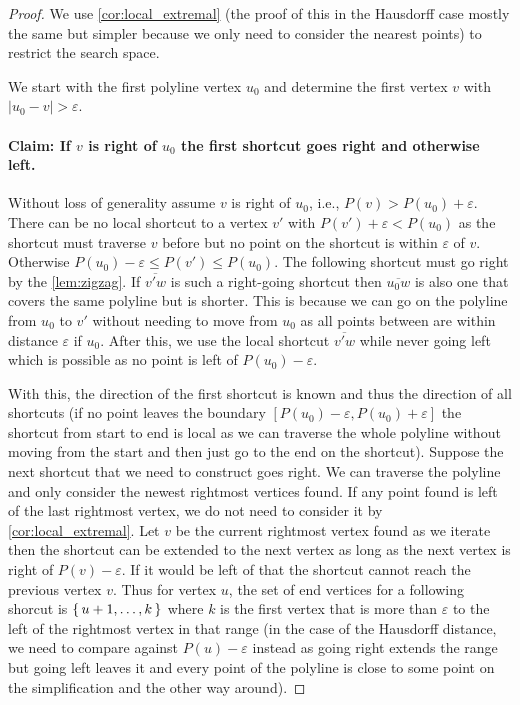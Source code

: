 \begin{proof}
	We use \cref{cor:local_extremal} (the proof of this in the Hausdorff case mostly the same but simpler because we only need to consider the nearest points) to restrict the search space.

	We start with the first polyline vertex \(u_0\) and determine the first vertex \(v\) with \(|u_0-v| > \varepsilon\).

	\paragraph{Claim: If \(v\) is right of \(u_0\) the first shortcut goes right and otherwise left. } Without loss of generality assume \(v\) is right of \(u_0\), i.e., \(P(v) > P(u_0) + \varepsilon\). There can be no local shortcut to a vertex \(v'\) with \(P(v') + \varepsilon < P(u_0)\) as the shortcut must traverse \(v\) before but no point on the shortcut is within \(\varepsilon\) of \(v\). Otherwise \(P(u_0) - \varepsilon \leq P(v') \leq P(u_0)\). The following shortcut must go right by the \cref{lem:zigzag}. If \(\overline{v'w}\) is such a right-going shortcut then \(\overline{u_0w}\) is also one that covers the same polyline but is shorter. This is because we can go on the polyline from \(u_0\) to \(v'\) without needing to move from \(u_0\) as all points between are within distance \(\varepsilon\) if \(u_0\). After this, we use the local shortcut \(\overline{v'w}\) while never going left which is possible as no point is left of \(P(u_0)-\varepsilon\).

	With this, the direction of the first shortcut is known and thus the direction of all shortcuts (if no point leaves the boundary \([P(u_0) - \varepsilon, P(u_0) + \varepsilon]\) the shortcut from start to end is local as we can traverse the whole polyline without moving from the start and then just go to the end on the shortcut). Suppose the next shortcut that we need to construct goes right. We can traverse the polyline and only consider the newest rightmost vertices found. If any point found is left of the last rightmost vertex, we do not need to consider it by \cref{cor:local_extremal}. Let \(v\) be the current rightmost vertex found as we iterate then the shortcut can be extended to the next vertex as long as the next vertex is right of \(P(v) - \varepsilon\). If it would be left of that the shortcut cannot reach the previous vertex \(v\). Thus for vertex \(u\), the set of end vertices for a following shorcut is \(\set{u+1, \dots, k}\) where \(k\) is the first vertex that is more than \(\varepsilon\) to the left of the rightmost vertex in that range (in the case of the Hausdorff distance, we need to compare against \(P(u) - \varepsilon\) instead as going right extends the range but going left leaves it and every point of the polyline is close to some point on the simplification and the other way around).


\end{proof}
